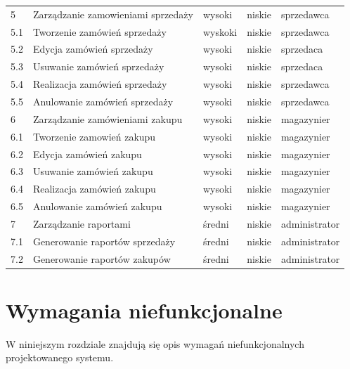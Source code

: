 \begin{table}[ht]
\begin{center}
\begin{tabular}{| l | l | l | l | l |}
		   	\hline
		   	5 & Zarządzanie zamowieniami sprzedaży & wysoki & niskie & sprzedawca \\
		   	5.1 & Tworzenie zamówień sprzedaży & wyskoki & niskie & sprzedawca \\
		   	5.2 & Edycja zamówień sprzedaży & wysoki & niskie & sprzedaca \\
		   	5.3 & Usuwanie zamówień sprzedaży & wysoki & niskie & sprzedaca \\
		   	5.4 & Realizacja zamówień sprzedaży & wysoki & niskie & sprzedawca \\
		   	5.5 & Anulowanie zamówień sprzedaży & wysoki & niskie & sprzedawca \\
		   	\hline
		   	6 & Zarządzanie zamówieniami zakupu & wysoki & niskie & magazynier \\
		   	6.1 & Tworzenie zamowień zakupu & wysoki & niskie & magazynier \\
		   	6.2 & Edycja zamówień zakupu & wysoki & niskie & magazynier \\
		   	6.3 & Usuwanie zamówień zakupu & wysoki & niskie & magazynier \\
		   	6.4 & Realizacja zamówień zakupu & wysoki & niskie & magazynier \\
		   	6.5 & Anulowanie zamówień zakupu & wysoki & niskie & magazynier \\
		   	\hline
		   	7 & Zarządzanie raportami & średni & niskie & administrator \\
		   	7.1 & Generowanie raportów sprzedaży & średni & niskie & administrator \\
		   	7.2 & Generowanie raportów zakupów & średni & niskie & administrator \\
		   	\hline
		   	\hline
	    \end{tabular}
	\end{center}
\end{table}
\FloatBarrier

\section{Wymagania niefunkcjonalne}

W niniejszym rozdziale znajdują się opis wymagań niefunkcjonalnych
projektowanego systemu.


